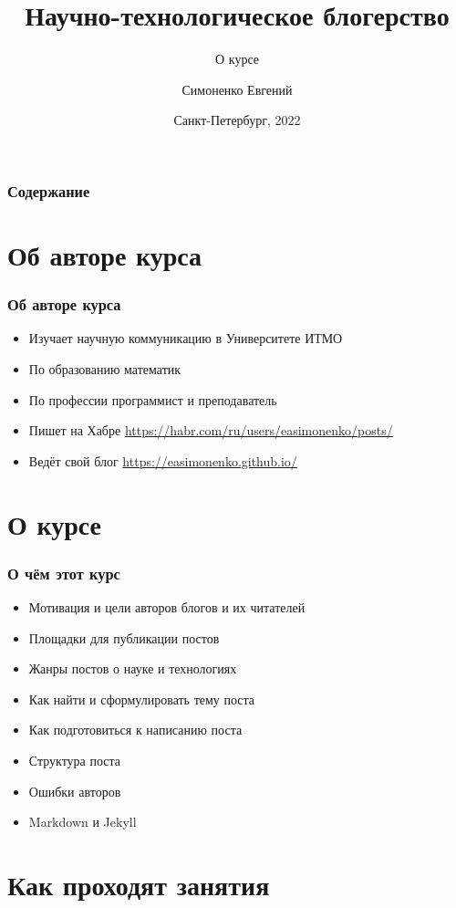 \documentclass[12pt]{beamer}
\title[Блогерство]{Научно-технологическое блогерство}
\subtitle{О курсе}
\author[]{Симоненко Евгений}
\institute[]{Университет ИТМО}
\date[]{Санкт-Петербург, 2022}
\begin{document}
\begin{frame}
  \titlepage
\end{frame}

\begin{frame}
  \frametitle{Содержание}
  \tableofcontents
\end{frame}

\section{Об авторе курса}

\begin{frame}
  \frametitle{Об авторе курса}
  \begin{itemize}
  \item Изучает научную коммуникацию в Университете ИТМО
  \item По образованию математик
  \item По профессии программист и преподаватель
  \item Пишет на Хабре \url{https://habr.com/ru/users/easimonenko/posts/}
  \item Ведёт свой блог \url{https://easimonenko.github.io/}
  \end{itemize}
\end{frame}

\section{О курсе}

\begin{frame}
  \frametitle{О чём этот курс}
  \begin{itemize}
  \item Мотивация и цели авторов блогов и их читателей
  \item Площадки для публикации постов
  \item Жанры постов о науке и технологиях
  \item Как найти и сформулировать тему поста
  \item Как подготовиться к написанию поста
  \item Структура поста
  \item Ошибки авторов
  \item Markdown и Jekyll
  \end{itemize}
\end{frame}

\section{Как проходят занятия}
\end{document}

